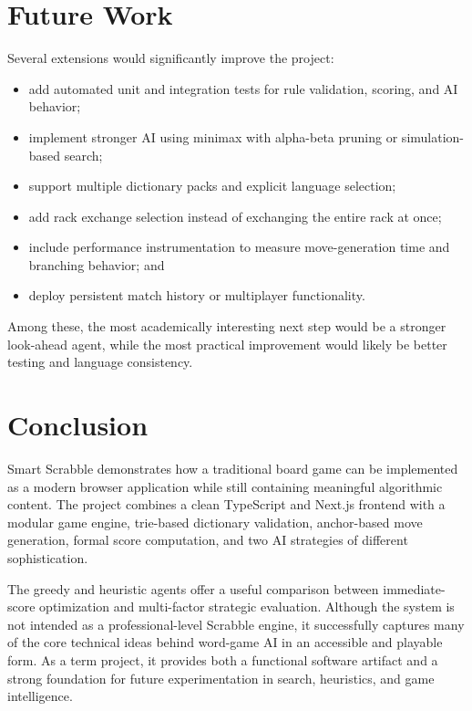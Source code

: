 \documentclass[conference]{IEEEtran}
\begin{document}
\section{Future Work}
Several extensions would significantly improve the project:
\begin{itemize}
\item add automated unit and integration tests for rule validation, scoring, and AI behavior;
\item implement stronger AI using minimax with alpha-beta pruning or simulation-based search;
\item support multiple dictionary packs and explicit language selection;
\item add rack exchange selection instead of exchanging the entire rack at once;
\item include performance instrumentation to measure move-generation time and branching behavior; and
\item deploy persistent match history or multiplayer functionality.
\end{itemize}

Among these, the most academically interesting next step would be a stronger look-ahead agent, while the most practical improvement would likely be better testing and language consistency.

\section{Conclusion}
Smart Scrabble demonstrates how a traditional board game can be implemented as a modern browser application while still containing meaningful algorithmic content. The project combines a clean TypeScript and Next.js frontend with a modular game engine, trie-based dictionary validation, anchor-based move generation, formal score computation, and two AI strategies of different sophistication.

The greedy and heuristic agents offer a useful comparison between immediate-score optimization and multi-factor strategic evaluation. Although the system is not intended as a professional-level Scrabble engine, it successfully captures many of the core technical ideas behind word-game AI in an accessible and playable form. As a term project, it provides both a functional software artifact and a strong foundation for future experimentation in search, heuristics, and game intelligence.



\end{document}
